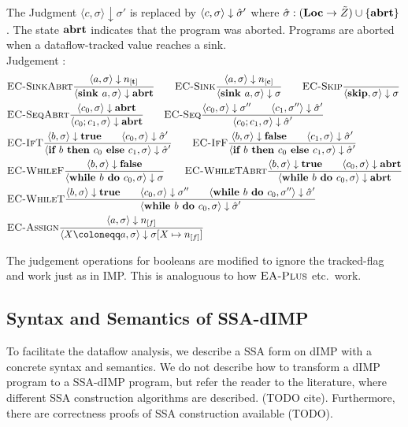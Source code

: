 The Judgment $\langle c, \sigma \rangle \downarrow \sigma'$ is replaced by 
$\langle c, \sigma \rangle \downarrow \hat{\sigma}'$
where $\hat{\sigma}{}: (\textbf{Loc} \to \tilde{Z}) \cup \{\textbf{abrt}\}$.
The state $\textbf{abrt}$ indicates that the program was aborted.
Programs are aborted when a dataflow-tracked value reaches a sink.
\\
Judgement :
\begin{align*}
    &\bsrule{EC-SinkAbrt}{\bigstep{a}{\store}{\tracked{}}}
    {\bigstep{\defaultsink}{\store}{\exception}} \qquad
    \bsrule{EC-Sink}{\bigstep{a}{\store}{\clean{}}}
    {\bigstep{\defaultsink}{\store}{\store}} \qquad
    \bsrule{EC-Skip}{}{\bigstep{\skipcmd}{\store}{\store}}\\
    &\bsrule{EC-SeqAbrt}{\bigstep{c_0}{\sigma}{\exception}}
    {\bigstep{\defaultseq}{\store}{\exception}} \qquad
    \bsrule{EC-Seq}{\bigstep{c_0}{\sigma}{\store''} \qquad \bigstep{c_1}{\store''}{\excstore'}}
    {\bigstep{\defaultseq}{\store}{\excstore'}}\\
    &\bsrule{EC-IfT}{\bigstep{b}{\store}{\btrue}\qquad \bigstep{c_0}{\store}{\excstore'}}
    {\bigstep{\defaultif}{\store}{\excstore'}} \qquad
    \bsrule{EC-IfF}{\bigstep{b}{\store}{\bfalse}\qquad \bigstep{c_1}{\store}{\excstore'}}
    {\bigstep{\defaultif}{\store}{\excstore'}}\\
    &\bsrule{EC-WhileF}{\bigstep{b}{\sigma}{\bfalse}}
    {\bigstep{\defaultwhile}{\store}{\store}} \qquad
    \bsrule{EC-WhileTAbrt}{\bigstep{b}{\sigma}{\btrue} \qquad \bigstep{c_0}{\store}{\exception}}
    {\bigstep{\defaultwhile}{\store}{\exception}}\\
    &\bsrule{EC-WhileT}{\bigstep{b}{\sigma}{\btrue} \qquad \bigstep{c_0}{\store}{\store''}\qquad
    \bigstep{\defaultwhile}{\store''}{\excstore'}}
    {\bigstep{\defaultwhile}{\store}{\excstore'}}\\
    &\bsrule{EC-Assign}{\bigstep{a}{\store}{\flagged{}}}
    {\bigstep{\defaultstore}{\store}{\store{}[X \mapsto \flagged{}]}}
\end{align*}

The judgement operations for booleans are modified to ignore the tracked-flag and work
just as in IMP. This is analoguous to how $\textsc{EA-Plus}$ etc.\ work.

\subsection{Syntax and Semantics of SSA-dIMP}
To facilitate the dataflow analysis, we describe a SSA form on dIMP with a concrete
syntax and semantics.
We do not describe how to transform a dIMP program to a SSA-dIMP program, but 
refer the reader to the literature, where different SSA construction algorithms are
described. (TODO cite). Furthermore, there are correctness proofs of SSA construction
available (TODO).

